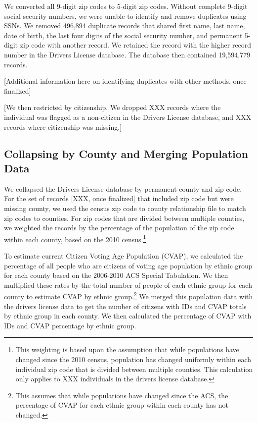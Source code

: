 \documentclass[12pt]{article}
\begin{document}
We converted all 9-digit zip codes to 5-digit zip codes.  Without complete 9-digit social security numbers, we were unable to identify and remove duplicates using SSNs.  We removed 496,894 duplicate records that shared first name, last name, date of birth, the last four digits of the social security number, and permanent 5-digit zip code with another record.  We retained the record with the higher record number in the Drivers License database.  The database then contained 19,594,779 records.

[Additional information here on identifying duplicates with other methods, once finalized]

[We then restricted by citizenship.  We dropped XXX records where the individual was flagged as a non-citizen in the Drivers License database, and XXX records where citizenship was missing.] 

\subsection{Collapsing by County and Merging Population Data}
We collapsed the Drivers License database by permanent county and zip code.  For the set of records [XXX, once finalized] that included zip code but were missing county, we used the census zip code to county relationship file to match zip codes to counties.  For zip codes that are divided between multiple counties, we weighted the records by the percentage of the population of the zip code within each county, based on the 2010 census.\footnote{This weighting is based upon the assumption that while populations have changed since the 2010 census, population has changed uniformly within each individual zip code that is divided between multiple counties.  This calculation only applies to XXX individuals in the drivers license database.}

To estimate current Citizen Voting Age Population (CVAP), we calculated the percentage of all people who are citizens of voting age population by ethnic group for each county based on the 2006-2010 ACS Special Tabulation.  We then multiplied these rates by the total number of people of each ethnic group for each county to estimate CVAP by ethnic group.\footnote{This assumes that while populations have changed since the ACS, the percentage of CVAP for each ethnic group within each county has not changed.}  We merged this population data with the drivers license data to get the number of citizens with IDs and CVAP totals by ethnic group in each county.  We then calculated the percentage of CVAP with IDs and CVAP percentage by ethnic group.
\end{document}
